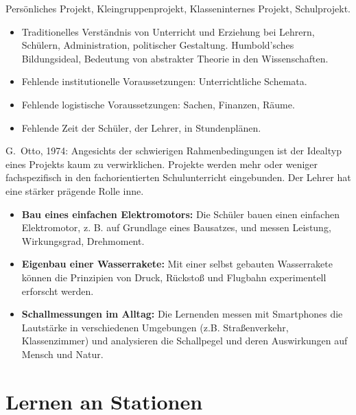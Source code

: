 Pers\"{o}nliches Projekt, Kleingruppenprojekt, Klasseninternes Projekt,
Schulprojekt.


\begin{itemize}
\item
Traditionelles Verst\"{a}ndnis von Unterricht und Erziehung bei Lehrern, Sch\"{u}lern,
Administration, politischer Gestaltung.
Humbold'sches Bildungsideal,
Bedeutung von abstrakter Theorie in den Wissenschaften.
\item
Fehlende institutionelle Voraussetzungen: Unterrichtliche Schemata.
\item
Fehlende logistische Voraussetzungen: Sachen, Finanzen, R\"{a}ume.
\item
Fehlende Zeit der Sch\"{u}ler, der Lehrer, in Stundenpl\"{a}nen.
\end{itemize}


G.\ Otto, 1974: Angesichts der schwierigen Rahmenbedingungen ist
der Idealtyp eines Projekts kaum zu verwirklichen.
Projekte werden mehr oder weniger fachspezifisch in den
fachorientierten Schulunterricht eingebunden.
Der Lehrer hat eine st\"{a}rker pr\"{a}gende Rolle inne.

\begin{beisp2}
	\begin{itemize}
		\item \textbf{Bau eines einfachen Elektromotors:} Die Schüler bauen einen einfachen Elektromotor, z. B. auf Grundlage eines Bausatzes, und messen Leistung, Wirkungsgrad, Drehmoment.
		\item \textbf{Eigenbau einer Wasserrakete:} Mit einer selbst gebauten Wasserrakete können die Prinzipien von Druck, Rückstoß und Flugbahn experimentell erforscht werden.
		\item \textbf{Schallmessungen im Alltag:} Die Lernenden messen mit Smartphones die Lautstärke in verschiedenen Umgebungen (z.B. Straßenverkehr, Klassenzimmer) und analysieren die Schallpegel und deren Auswirkungen auf Mensch und Natur.
	\end{itemize}
\end{beisp2}

\section{Lernen an Stationen}

